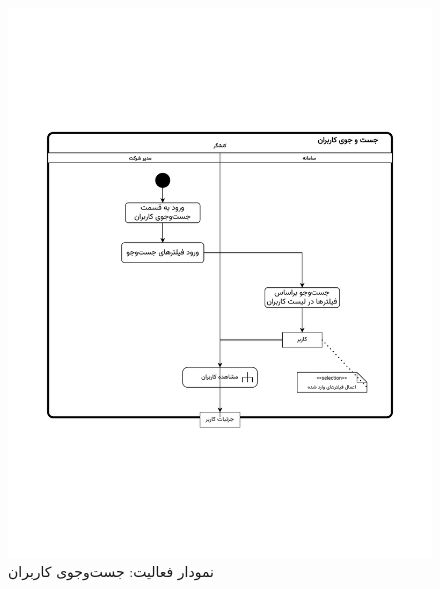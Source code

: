 \begin{figure}[ht!]
	\centering
	\includegraphics[scale=0.8, page=1]{figs/OOD-activity-searchuser.pdf}
	\caption{نمودار فعالیت: جست‌وجوی کاربران}
\end{figure}
\FloatBarrier
\newpage

